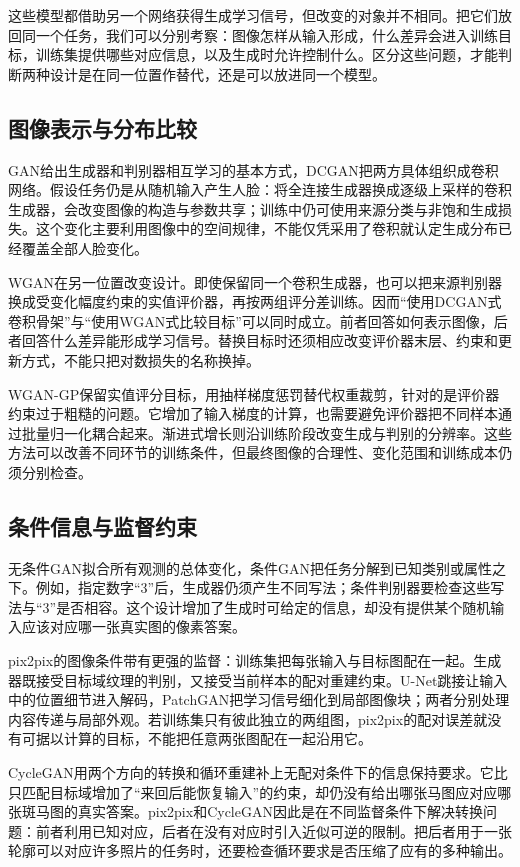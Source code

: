 这些模型都借助另一个网络获得生成学习信号，但改变的对象并不相同。把它们放回同一个任务，我们可以分别考察：图像怎样从输入形成，什么差异会进入训练目标，训练集提供哪些对应信息，以及生成时允许控制什么。区分这些问题，才能判断两种设计是在同一位置作替代，还是可以放进同一个模型。

\subsection{图像表示与分布比较}

GAN给出生成器和判别器相互学习的基本方式，DCGAN把两方具体组织成卷积网络。假设任务仍是从随机输入产生人脸：将全连接生成器换成逐级上采样的卷积生成器，会改变图像的构造与参数共享；训练中仍可使用来源分类与非饱和生成损失。这个变化主要利用图像中的空间规律，不能仅凭采用了卷积就认定生成分布已经覆盖全部人脸变化。

WGAN在另一位置改变设计。即使保留同一个卷积生成器，也可以把来源判别器换成受变化幅度约束的实值评价器，再按两组评分差训练。因而“使用DCGAN式卷积骨架”与“使用WGAN式比较目标”可以同时成立。前者回答如何表示图像，后者回答什么差异能形成学习信号。替换目标时还须相应改变评价器末层、约束和更新方式，不能只把对数损失的名称换掉。

WGAN-GP保留实值评分目标，用抽样梯度惩罚替代权重裁剪，针对的是评价器约束过于粗糙的问题。它增加了输入梯度的计算，也需要避免评价器把不同样本通过批量归一化耦合起来。渐进式增长则沿训练阶段改变生成与判别的分辨率。这些方法可以改善不同环节的训练条件，但最终图像的合理性、变化范围和训练成本仍须分别检查。

\subsection{条件信息与监督约束}

无条件GAN拟合所有观测的总体变化，条件GAN把任务分解到已知类别或属性之下。例如，指定数字“3”后，生成器仍须产生不同写法；条件判别器要检查这些写法与“3”是否相容。这个设计增加了生成时可给定的信息，却没有提供某个随机输入应该对应哪一张真实图的像素答案。

pix2pix的图像条件带有更强的监督：训练集把每张输入与目标图配在一起。生成器既接受目标域纹理的判别，又接受当前样本的配对重建约束。U-Net跳接让输入中的位置细节进入解码，PatchGAN把学习信号细化到局部图像块；两者分别处理内容传递与局部外观。若训练集只有彼此独立的两组图，pix2pix的配对误差就没有可据以计算的目标，不能把任意两张图配在一起沿用它。

CycleGAN用两个方向的转换和循环重建补上无配对条件下的信息保持要求。它比只匹配目标域增加了“来回后能恢复输入”的约束，却仍没有给出哪张马图应对应哪张斑马图的真实答案。pix2pix和CycleGAN因此是在不同监督条件下解决转换问题：前者利用已知对应，后者在没有对应时引入近似可逆的限制。把后者用于一张轮廓可以对应许多照片的任务时，还要检查循环要求是否压缩了应有的多种输出。

